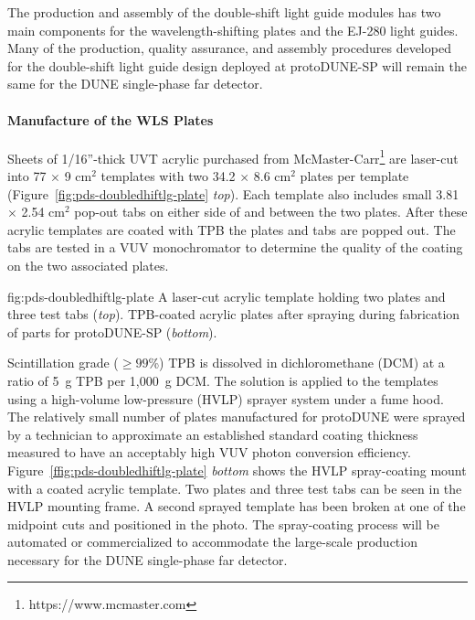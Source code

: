 The production and assembly of the double-shift light guide modules has two main components for the wavelength-shifting plates and the EJ-280 light guides. Many of the production, quality assurance, and assembly procedures developed for the double-shift light guide design deployed at protoDUNE-SP will remain the same for the DUNE single-phase far detector.
																								
\paragraph*{Manufacture of the WLS Plates}

Sheets of 1/16''-thick UVT acrylic purchased from McMaster-Carr\footnote{https://www.mcmaster.com} are laser-cut into 77 $\times$ 9 cm$^2$ templates with two 34.2 $\times$ 8.6 cm$^2$ plates per template (Figure~\ref{fig:pds-doubledhiftlg-plate} {\it top}). Each template also includes small 3.81 $\times$ 2.54 cm$^2$ pop-out tabs on either side of and between the two plates. After these acrylic templates are coated with TPB the plates and tabs are popped out. The tabs are tested in a VUV monochromator to determine the quality of the coating on the two associated plates.

\begin{dunefigure}
{fig:pds-doubledhiftlg-plate}
{A laser-cut acrylic template holding two plates and three test tabs ({\it top}). TPB-coated acrylic plates after spraying during fabrication of parts for protoDUNE-SP ({\it bottom}).}
\end{dunefigure}

Scintillation grade ($\ge 99$\%) TPB is dissolved in dichloromethane (DCM) at a ratio of 5~g TPB per 1,000~g DCM. The solution is applied to the templates using a high-volume low-pressure (HVLP) sprayer system under a fume hood. The relatively small number of plates manufactured for protoDUNE were sprayed by a technician to approximate an established standard coating thickness measured to have an acceptably high VUV photon conversion efficiency. Figure~\ref{ffig:pds-doubledhiftlg-plate} {\it bottom} shows the HVLP spray-coating mount with a coated acrylic template. Two plates and three test tabs can be seen in the HVLP mounting frame. A second sprayed template has been broken at one of the midpoint cuts and positioned in the photo. The spray-coating process will be automated or commercialized to accommodate the large-scale production necessary for the DUNE single-phase far detector.

